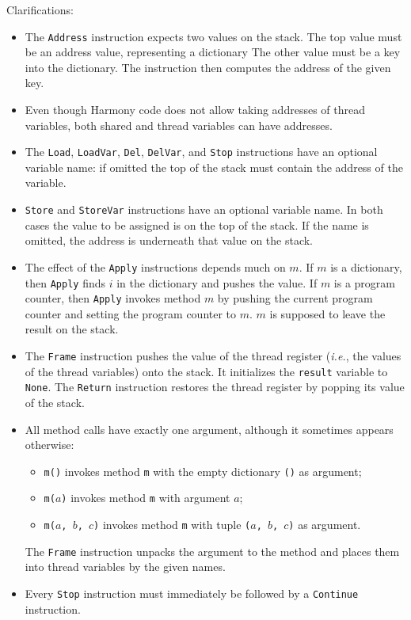 \documentclass{report}
\begin{document}
\newpage
Clarifications:
\begin{itemize}
\item The \texttt{Address} instruction expects two values on the stack.
The top value must be an address value, representing a dictionary 
The other value must be a key into the dictionary.
The instruction then computes the address of the given key.
\item Even though Harmony code does not allow taking addresses of thread variables, both
shared and thread variables can have addresses.
\item The \texttt{Load}, \texttt{LoadVar}, \texttt{Del}, \texttt{DelVar},
and \texttt{Stop} instructions have an optional
variable name: if omitted the top of the stack must contain the address of
the variable.
\item \texttt{Store} and \texttt{StoreVar} instructions have an optional
variable name.  In both cases the value to be assigned is on the top
of the stack.  If the name is omitted, the address is underneath that
value on the stack.
\item The effect of the \texttt{Apply} instructions depends much on $m$.
If $m$ is a dictionary, then \texttt{Apply} finds $i$ in the dictionary
and pushes the value.
If $m$ is a program counter, then \texttt{Apply} invokes method $m$ by
pushing the current program counter and setting the program counter to
$m$.  $m$ is supposed to leave the result on the stack.
\item The \texttt{Frame} instruction pushes the value of the thread
register (\emph{i.e.}, the values of the thread variables) onto the
stack.  It initializes the \texttt{result} variable to \texttt{None}.
The \texttt{Return} instruction restores the thread register by popping
its value of the stack.
\item All method calls have exactly one argument, although it sometimes
appears otherwise:
\begin{itemize}
\item \texttt{m()} invokes method \texttt{m} with the empty dictionary \texttt{()} as argument;
\item \texttt{m($a$)} invokes method \texttt{m} with argument $a$;
\item \texttt{m($a$, $b$, $c$)} invokes method \texttt{m} with tuple \texttt{($a$, $b$, $c$)} as argument.
\end{itemize}
The \texttt{Frame} instruction unpacks the argument to the method and places them into thread variables by the given names.
\item Every \texttt{Stop} instruction must immediately be followed by a 
\texttt{Continue} instruction.
\end{itemize}
\end{document}
